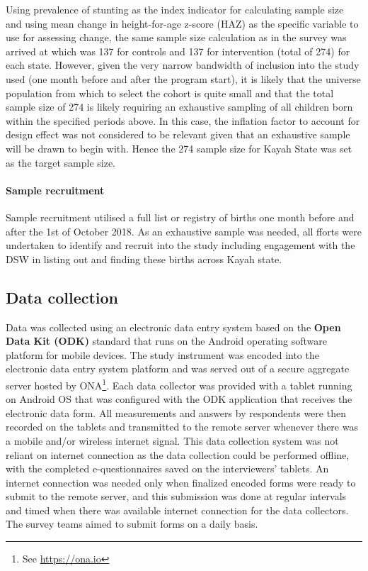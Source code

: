 \documentclass[12pt,a4paper]{article}
\let\oldparagraph\paragraph
\renewcommand{\paragraph}[1]{\oldparagraph{#1}\mbox{}}
\let\rmarkdownfootnote\footnote%
\def\footnote{\protect\rmarkdownfootnote}
\begin{document}
Using prevalence of stunting as the index indicator for calculating sample size and using mean change in height-for-age z-score (HAZ) as the specific variable to use for assessing change, the same sample size calculation as in the survey was arrived at which was 137 for controls and 137 for intervention (total of 274) for each state.
However, given the very narrow bandwidth of inclusion into the study used (one month before and after the program start), it is likely that the universe population from which to select the cohort is quite small and that the total sample size of 274 is likely requiring an exhaustive sampling of all children born within the specified periods above. In this case, the inflation factor to account for design effect was not considered to be relevant given that an exhaustive sample will be drawn to begin with. Hence the 274 sample size for Kayah State was set as the target sample size.

\hypertarget{sample-recruitment}{%
\paragraph{Sample recruitment}\label{sample-recruitment}}

Sample recruitment utilised a full list or registry of births one month before and after the 1st of October 2018. As an exhaustive sample was needed, all fforts were undertaken to identify and recruit into the study including engagement with the DSW in listing out and finding these births across Kayah state.

\hypertarget{data-collection}{%
\subsection{Data collection}\label{data-collection}}

Data was collected using an electronic data entry system based on the \textbf{Open Data Kit (ODK)} standard that runs on the Android operating software platform for mobile devices. The study instrument was encoded into the electronic data entry system platform and was served out of a secure aggregate server hosted by ONA\footnote{See \url{https://ona.io}}. Each data collector was provided with a tablet running on Android OS that was configured with the ODK application that receives the electronic data form. All measurements and answers by respondents were then recorded on the tablets and transmitted to the remote server whenever there was a mobile and/or wireless internet signal. This data collection system was not reliant on internet connection as the data collection could be performed offline, with the completed e-questionnaires saved on the interviewers' tablets. An internet connection was needed only when finalized encoded forms were ready to submit to the remote server, and this submission was done at regular intervals and timed when there was available internet connection for the data collectors. The survey teams aimed to submit forms on a daily basis.
\end{document}
